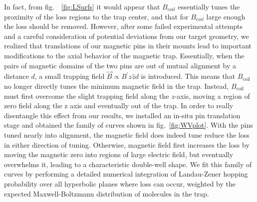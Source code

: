 \documentclass[%
 reprint,
 amsmath,amssymb,
 aps,
prl,
]{revtex4-1}
\begin{document}
In fact, from fig.~~\ref{fig:LSurfs} it would appear that $B_{coil}$ essentially tunes the proximity of the loss regions to the trap center, and that for $B_{coil}$ large enough the loss should be removed. However, after some failed experimental attempts and a careful consideration of potential deviations from our target geometry, we realized that translations of our magnetic pins in their mounts lead to important modifications to the axial behavior of the magnetic trap. Essentially, when the pairs of magnetic domains of the two pins are out of mutual alignment by a distance $d$, a small trapping field $\vec{B}\propto B^\prime z\hat{z} d$ is introduced. This means that $B_\text{coil}$ no longer directly tunes the minimum magnetic field in the trap. Instead, $B_\text{coil}$ must first overcome the slight trapping field along the $z$-axis, moving a region of zero field along the z axis and eventually out of the trap. In order to really disentangle this effect from our results, we installed an in-situ pin translation stage and obtained the family of curves shown in fig.~\ref{fig:WVplot}. With the pins tuned nearly into alignment, the magnetic field does indeed tune reduce the loss in either direction of tuning. Otherwise, magnetic field first increases the loss by moving the magnetic zero into regions of large electric field, but eventually overwhelms it, leading to a characteristic double-well shape. We fit this family of curves by performing a detailed numerical integration of Landau-Zener hopping probability over all hyperbolic planes where loss can occur, weighted by the expected Maxwell-Boltzmann distribution of molecules in the trap.
\end{document}
